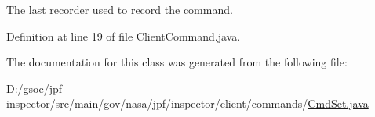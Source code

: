 The last recorder used to record the command. 



Definition at line 19 of file Client\+Command.\+java.



The documentation for this class was generated from the following file\+:\begin{DoxyCompactItemize}
\item 
D\+:/gsoc/jpf-\/inspector/src/main/gov/nasa/jpf/inspector/client/commands/\hyperlink{_cmd_set_8java}{Cmd\+Set.\+java}\end{DoxyCompactItemize}
